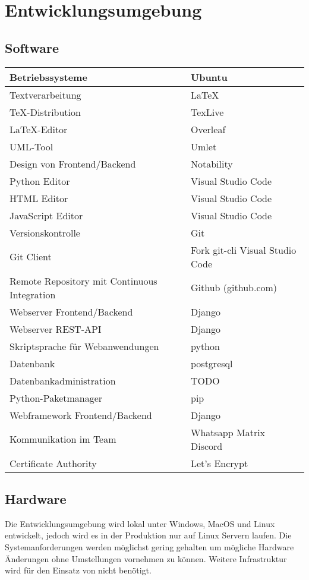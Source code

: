 \section{Entwicklungsumgebung}
\subsection{Software}
\begin{table}[htbp]
    \begin{tabu} to \textwidth {| X | X |}
    \hline
    Betriebssysteme & Ubuntu \\
    \hline
    Textverarbeitung & \LaTeX \\
    \hline
    TeX-Distribution & TexLive \\
    \hline
    \LaTeX{-Editor} & Overleaf \\
    \hline
    \gls{UML}-Tool & Umlet\\
    \hline
    Design von \gls{Frontend}/\gls{Backend} & Notability \\
    \hline
    \gls{Python} Editor & Visual Studio Code \\
    \hline
    \gls{HTML} Editor & Visual Studio Code \\
    \hline
    \gls{JavaScript} Editor & Visual Studio Code \\
    \hline
    \gls{Versionskontrolle} & Git \\
    \hline
    Git \gls{Client} & Fork git-cli Visual Studio Code\\
    \hline
    \gls{Remote Repository} mit \gls{Continuous Integration} & Github (github.com) \\
    \hline
    Webserver Frontend/Backend & Django \\
    \hline
    Webserver \gls{REST-API} & Django \\
    \hline
    Skriptsprache für Webanwendungen & python \\
    \hline
    \gls{Datenbank} & postgresql \\
    \hline
    Datenbankadministration & TODO \\
    \hline
    Python-Paketmanager & pip \\
    \hline
    \gls{Webframework} Frontend/Backend & Django \\
    \hline
    Kommunikation im Team & Whatsapp Matrix Discord\\
    \hline
     \gls{Certificate Authority} & Let's Encrypt \\
    \hline
\end{tabu}
\end{table}

\subsection{Hardware}
Die Entwicklungsumgebung wird lokal unter Windows, MacOS und Linux entwickelt, jedoch wird es in der Produktion nur auf Linux Servern laufen. Die Systemanforderungen werden möglichst gering gehalten um mögliche Hardware Änderungen ohne Umstellungen vornehmen zu können.
Weitere Infrastruktur wird für den Einsatz von \name nicht benötigt.